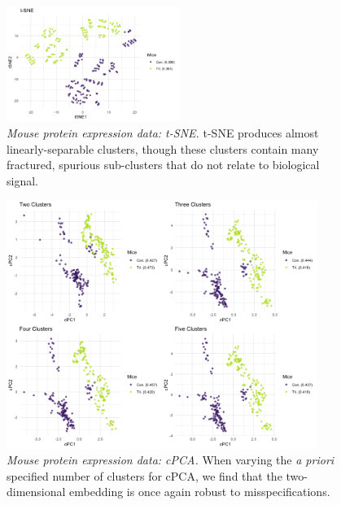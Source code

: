 \begin{figure}[!htbp]
    \centering
    \includegraphics[width=0.5\textwidth]{figures/mice_tsne.png}
    \caption{
    \textit{Mouse protein expression data: t-SNE.}
    t-SNE produces almost linearly-separable clusters, though these clusters contain many fractured, spurious sub-clusters that do not relate to biological signal.
    }
    \label{fig:mice_tsne}
\end{figure}

\begin{figure}[!htbp]
    \centering
    \includegraphics[width=0.9\textwidth]{figures/mice_cpca_centers.png}
    \caption{
    \textit{Mouse protein expression data: cPCA.}
    When varying the \textit{a priori} specified number of clusters for cPCA, we find that the two-dimensional embedding is once again robust to misspecifications.
    }
    \label{fig:mice_cpca_centers}
\end{figure}

